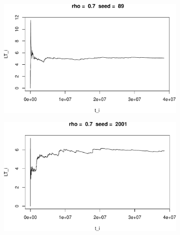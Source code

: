 \documentclass[]{article}
\begin{document}
\begin{figure}[h!]
\begin{subfigure}[b]{.55\linewidth}
\includegraphics[width=\linewidth]{003_files/figure-latex/unnamed-chunk-17-7.pdf}
\end{subfigure}\hfill
\begin{subfigure}[b]{.55\linewidth}
\includegraphics[width=\linewidth]{003_files/figure-latex/unnamed-chunk-17-8.pdf}
\end{subfigure}\vfill
\end{figure}
\end{document}
